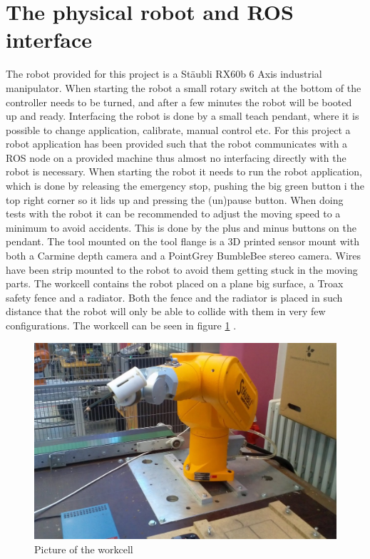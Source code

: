 

\section{The physical robot and ROS interface}
\label{sec:robot_physical}
The robot provided for this project is a Stäubli RX60b 6 Axis industrial manipulator. When starting the robot a small rotary switch at the bottom of the controller needs to be turned, and after a few minutes the robot will be booted up and ready. Interfacing the robot is done by a small teach pendant, where it is possible to change application, calibrate, manual control etc. For this project a robot application has been provided such that the robot communicates with a ROS node on a provided machine thus almost no interfacing directly with the robot is necessary. When starting the robot it needs to run the robot application, which is done by releasing the emergency stop, pushing the big green button i the top right corner so it lids up and pressing the (un)pause button. When doing tests with the robot it can be recommended to adjust the moving speed to a minimum to avoid accidents. This is done by the plus and minus buttons on the pendant.
The tool mounted on the tool flange is a 3D printed sensor mount with both a Carmine depth camera and a PointGrey BumbleBee stereo camera. Wires have been strip mounted to the robot to avoid them getting stuck in the moving parts. 
The workcell contains the robot placed on a plane big surface, a Troax safety fence and a radiator. Both the fence and the radiator is placed in such distance that the robot will only be able to collide with them in very few configurations. The workcell can be seen in figure \ref{fig:workcell} .

\begin{figure}[htb]
	\begin{center}
		\includegraphics[scale=0.4,trim=0 0 0 0]{graphics/05_robotics/workcell.png}%
		\caption{Picture of the workcell}
		\label{fig:workcell}
	\end{center}
\end{figure}



